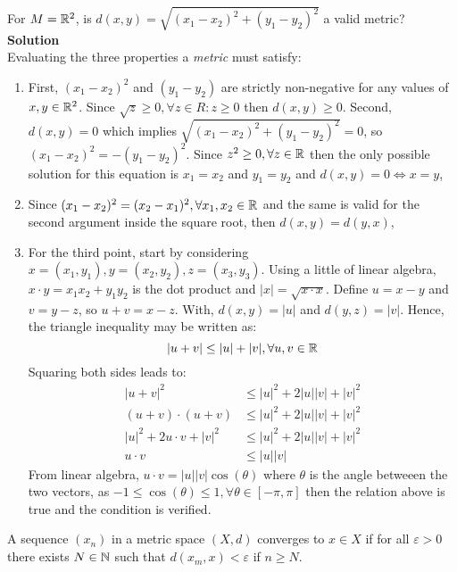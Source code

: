 \begin{eg}
    For $M = \mathbb{R}^2$, is $d(x, y) = \sqrt{(x_1 -  x_2)^2 + (y_1 - y_2)^2}$ a valid metric? \\
    \textbf{Solution} \\
    Evaluating the three properties a \emph{metric} must satisfy:
    \begin{enumerate}
        \item First, $(x_1 - x_2)^2$ and $(y_1 - y_2)$ are strictly non-negative for any values of $x,y \in \mathbb{R}^2$. Since $\sqrt{z} \geq 0, \forall z \in R : z \geq 0$ then $d(x, y) \geq 0$. Second, $d(x, y) = 0$ which implies $\sqrt{(x_1 - x_2)^2 + (y_1- y_2)^2} = 0$, so $(x_1 - x_2)^2 = - (y_1 - y_2)^2$. Since $z^2 \geq 0, \forall z \in \mathbb{R}$ then the only possible solution for this equation is $x_1 = x_2$ and $y_1 = y_2$ and $d(x, y) = 0 \Longleftrightarrow x = y$,
        \item Since $(x_1 - x_2)^2 = (x_2 - x_1)^2, \forall x_1, x_2 \in \mathbb{R}$ and the same is valid for the second argument inside the square root, then $d(x, y) = d(y, x)$,
        \item For the third point, start by considering $x = (x_1, y_1), y = (x_2, y_2), z = (x_3, y_3)$. Using a little of linear algebra, $x \cdot y = x_1x_2 + y_1y_2$ is the dot product and $|x| = \sqrt{x \cdot x}$. Define $u = x - y$ and $v = y - z$, so $u + v = x - z$. With, $d(x,y) = |u|$ and $d(y,z) = |v|$. Hence, the triangle inequality may be written as:
        \begin{equation*}
            |u + v| \leq |u| + |v|, \forall u, v \in \mathbb{R}
        \end{equation*}
        Squaring both sides leads to:
        \begin{align*}
            |u + v|^2 &\leq |u|^2 + 2|u||v| + |v|^2 \\
            (u + v) \cdot (u + v) &\leq |u|^2 + 2|u||v| + |v|^2 \\
            |u|^2 + 2u\cdot v + |v|^2 &\leq |u|^2 + 2|u||v| + |v|^2 \\
            u\cdot v &\leq |u||v|
        \end{align*}
        From linear algebra, $u \cdot v = |u||v|\cos(\theta)$ where $\theta$ is the angle betweeen the two vectors, as $-1 \leq \cos(\theta) \leq 1 ,\forall \theta \in [-\pi, \pi]$ then the relation above is true and the condition is verified.
    \end{enumerate}
\end{eg}

\begin{definition}[Convergence]
    A sequence $(x_n) $ in a metric space $(X, d)$ converges to $x \in X$ if for all $\varepsilon > 0$ there exists $N \in \mathbb{N}$ such that $d(x_m, x) < \varepsilon$ if $n \geq N$.
\end{definition}

